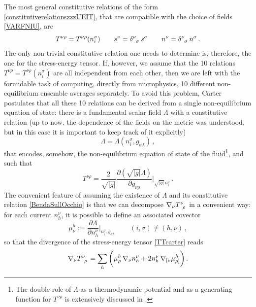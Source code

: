 \documentclass[a4paper, amsfonts, amssymb, amsmath, reprint, twocolumn, showkeys, nofootinbib]{revtex4-2}
\begin{document}
The most general constitutive relations of the form \eqref{constitutiverelationszzzUEIT}, that are compatible with the choice of fields \eqref{VARFNIU}, are
\begin{equation}\label{constitCARTKAL}
 T^{\nu \rho} = T^{\nu \rho} (n^\sigma_i)  \quad \quad 
 s^\nu = \delta\indices{^\nu _\sigma} \, s^\sigma \quad \quad 
  n^\nu = \delta\indices{^\nu _\sigma} \, n^\sigma \, .
\end{equation}
The only non-trivial constitutive relation one needs to determine is, therefore, the one for the stress-energy tensor. If, however, we assume that the 10 relations $T^{\nu \rho} = T^{\nu \rho} (n^\sigma_i)$ are all independent from each other, then we are left with the formidable task of computing, directly from microphysics, 10 different non-equilibrium ensemble averages separately. 
To avoid this problem, Carter postulates that all these 10 relations can be derived  from a single non-equilibrium equation of state:  there is a fundamental scalar field $\Lambda$ with a constitutive relation (up to now, the dependence of the fields on the metric was understood, but in this case it is important to keep track of it explicitly) 
\begin{equation}
\label{BendaSullOcchio}
\Lambda = \Lambda(n_i^\sigma, g_{\sigma \lambda}) \, ,
\end{equation}
that encodes, somehow, the non-equilibrium equation of state of the fluid\footnote{
The double role of $\Lambda$ as a thermodynamic potential and as a generating function for $T^{\nu \rho}$ is extensively discussed in \citep{Termo}.
}, and such that
\begin{equation}\label{TTcarter}
T^{\nu \rho} = \dfrac{2}{\sqrt{|g|}} \dfrac{\partial (\sqrt{|g|}\Lambda)}{\partial g_{\nu \rho}} \bigg|_{\sqrt{|g|} \, n_i^\sigma} \, .
\end{equation}    
The convenient feature of assuming the existence of $\Lambda$ and its constitutive relation \eqref{BendaSullOcchio} is that we can decompose $\nabla_\nu T\indices{^\nu _\rho}$ in a convenient way: for each current $n^\nu_h$, it is possible to define an associated covector 
\begin{equation}
\mu_\nu^h := \dfrac{\partial \Lambda}{\partial n_h^\nu} \bigg|_{n_i^\sigma,g_{\sigma \lambda}} \, 
\qquad (i,\sigma)\neq (h,\nu) \, ,
\end{equation}
so that the divergence of the stress-energy tensor \eqref{TTcarter} reads
\citep{Carter_starting_point}
\begin{equation}
\nabla_\nu T\indices{^\nu _\rho} = \sum_h \bigg( \mu^h_\rho \, \nabla_\nu n_h^\nu + 2n_h^\nu \, \nabla_{ [ \nu} \mu_{\rho ]}^h \bigg) \, .
\end{equation}
\end{document}
